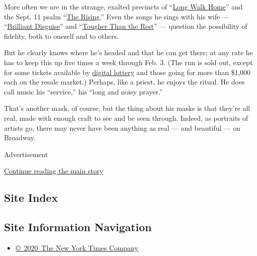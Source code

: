 More often we are in the strange, exalted precincts of
``\href{https://www.youtube.com/watch?v=iywFZqtPlhU}{Long Walk Home}''
and the Sept. 11 psalm
``\href{https://www.youtube.com/watch?v=6i-fiRgbpr4}{The Rising}.'' Even
the songs he sings with his wife ---
``\href{https://www.youtube.com/watch?v=idnJnjV_8rg}{Brilliant
Disguise}'' and
``\href{https://www.youtube.com/watch?v=_91hNV6vuBY}{Tougher Than the
Rest}'' --- question the possibility of fidelity, both to oneself and to
others.

But he clearly knows where he's headed and that he can get there; at any
rate he has to keep this up five times a week through Feb. 3. (The run
is sold out, except for some tickets available by
\href{https://www.nytimes3xbfgragh.onion/2017/09/28/theater/bruce-springsteen-broadway-tickets-lottery.html}{digital
lottery} and those going for more than \$1,000 each on the resale
market.) Perhaps, like a priest, he enjoys the ritual. He does call
music his ``service,'' his ``long and noisy prayer.''

That's another mask, of course, but the thing about his masks is that
they're all real, made with enough craft to see and be seen through.
Indeed, as portraits of artists go, there may never have been anything
as real --- and beautiful --- on Broadway.

Advertisement

\protect\hyperlink{after-bottom}{Continue reading the main story}

\hypertarget{site-index}{%
\subsection{Site Index}\label{site-index}}

\hypertarget{site-information-navigation}{%
\subsection{Site Information
Navigation}\label{site-information-navigation}}

\begin{itemize}
\tightlist
\item
  \href{https://help.nytimes3xbfgragh.onion/hc/en-us/articles/115014792127-Copyright-notice}{©~2020~The
  New York Times Company}
\end{itemize}

